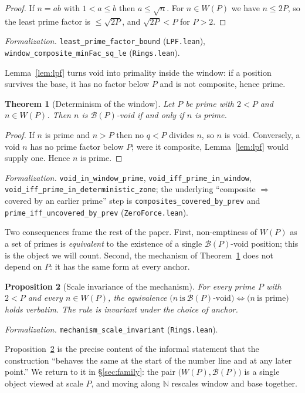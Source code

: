 \documentclass[11pt,a4paper]{amsart}
\theoremstyle{plain}
\newtheorem{theorem}{Theorem}[section]
\newtheorem{proposition}[theorem]{Proposition}
\theoremstyle{definition}
\theoremstyle{plain}
\theoremstyle{remark}
\newcommand{\lean}[1]{\textup{\texttt{#1}}}
\newcommand{\Formal}[1]{\par\smallskip\noindent\emph{Formalization.} #1\par\smallskip}
\begin{document}
\begin{proof}
If $n=ab$ with $1<a\le b$ then $a\le\sqrt n$. For $n\in W(P)$ we have $n\le 2P$, so the
least prime factor is $\le\sqrt{2P}$, and $\sqrt{2P}<P$ for $P>2$.
\end{proof}

\Formal{\lean{least\_prime\_factor\_bound} (\lean{LPF.lean}),
\lean{window\_composite\_minFac\_sq\_le} (\lean{Rings.lean}).}

Lemma~\ref{lem:lpf} turns void into primality inside the window: if a position survives
the base, it has no factor below $P$ and is not composite, hence prime.

\begin{theorem}[Determinism of the window]\label{thm:det}
Let $P$ be prime with $2<P$ and $n\in W(P)$. Then $n$ is $\mathcal{B}(P)$-void if and only
if $n$ is prime.
\end{theorem}

\begin{proof}
If $n$ is prime and $n>P$ then no $q<P$ divides $n$, so $n$ is void. Conversely, a void
$n$ has no prime factor below $P$; were it composite, Lemma~\ref{lem:lpf} would supply
one. Hence $n$ is prime.
\end{proof}

\Formal{\lean{void\_in\_window\_prime}, \lean{void\_iff\_prime\_in\_window},
\lean{void\_iff\_prime\_in\_deterministic\_zone}; the underlying
\enquote{composite $\Rightarrow$ covered by an earlier prime} step is
\lean{composites\_covered\_by\_prev} and \lean{prime\_iff\_uncovered\_by\_prev}
(\lean{ZeroForce.lean}).}

Two consequences frame the rest of the paper. First, non-emptiness of $W(P)$ as a set of
primes is \emph{equivalent} to the existence of a single $\mathcal{B}(P)$-void position;
this is the object we will count. Second, the mechanism of Theorem~\ref{thm:det} does not
depend on $P$: it has the same form at every anchor.

\begin{proposition}[Scale invariance of the mechanism]\label{prop:scale}
For every prime $P$ with $2<P$ and every $n\in W(P)$, the equivalence
$\big(n\ \text{is}\ \mathcal{B}(P)\text{-void}\big)\Leftrightarrow\big(n\ \text{is prime}\big)$
holds verbatim. The rule is invariant under the choice of anchor.
\end{proposition}

\Formal{\lean{mechanism\_scale\_invariant} (\lean{Rings.lean}).}

Proposition~\ref{prop:scale} is the precise content of the informal statement that the
construction \enquote{behaves the same at the start of the number line and at any later
point.} We return to it in \S\ref{sec:family}: the pair $\big(W(P),\mathcal{B}(P)\big)$ is
a single object viewed at scale $P$, and moving along $\mathbb{N}$ rescales window and base
together.
\end{document}
